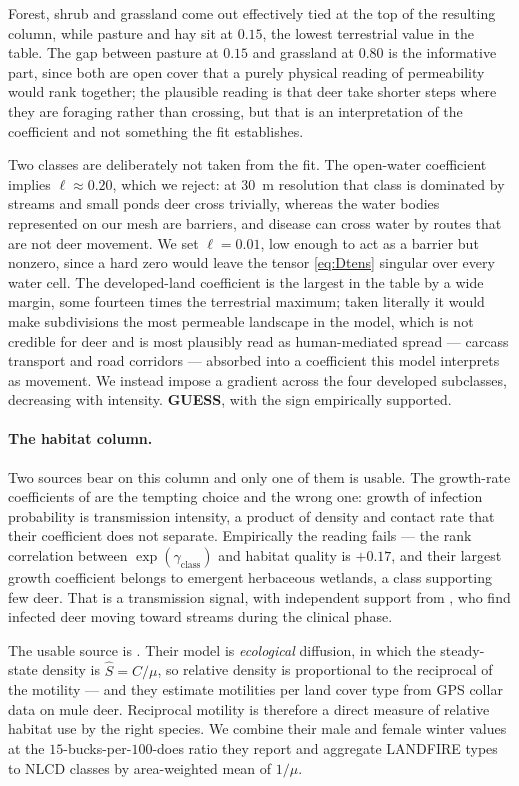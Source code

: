 \documentclass[11pt]{article}
\newcommand{\tagGUESS}{{\footnotesize\textsf{\textbf{\textcolor{red!70!black}{GUESS}}}}}
\begin{document}
Forest, shrub and grassland come out effectively tied at the top of the resulting column, while pasture and hay sit at $0.15$, the lowest terrestrial value in the table. The gap between pasture at $0.15$ and grassland at $0.80$ is the informative part, since both are open cover that a purely physical reading of permeability would rank together; the plausible reading is that deer take shorter steps where they are foraging rather than crossing, but that is an interpretation of the coefficient and not something the fit establishes.

Two classes are deliberately not taken from the fit. The open-water coefficient implies $\ell \approx 0.20$, which we reject: at $30$~m resolution that class is dominated by streams and small ponds deer cross trivially, whereas the water bodies represented on our mesh are barriers, and disease can cross water by routes that are not deer movement. We set $\ell = 0.01$, low enough to act as a barrier but nonzero, since a hard zero would leave the tensor \eqref{eq:Dtens} singular over every water cell. The developed-land coefficient is the largest in the table by a wide margin, some fourteen times the terrestrial maximum; taken literally it would make subdivisions the most permeable landscape in the model, which is not credible for deer and is most plausibly read as human-mediated spread --- carcass transport and road corridors --- absorbed into a coefficient this model interprets as movement. We instead impose a gradient across the four developed subclasses, decreasing with intensity. \tagGUESS{}, with the sign empirically supported.

\paragraph{The habitat column.} Two sources bear on this column and only one of them is usable. The growth-rate coefficients of \citet{MandujanoReyes2025} are the tempting choice and the wrong one: growth of infection probability is transmission intensity, a product of density and contact rate that their coefficient does not separate. Empirically the reading fails --- the rank correlation between $\exp(\gamma_{\text{class}})$ and habitat quality is $+0.17$, and their largest growth coefficient belongs to emergent herbaceous wetlands, a class supporting few deer. That is a transmission signal, with independent support from \citet{Barrile2024}, who find infected deer moving toward streams during the clinical phase.

The usable source is \citet{Garlick2013}. Their model is \emph{ecological} diffusion, in which the steady-state density is $\hat S = C/\mu$, so relative density is proportional to the reciprocal of the motility --- and they estimate motilities per land cover type from GPS collar data on mule deer. Reciprocal motility is therefore a direct measure of relative habitat use by the right species. We combine their male and female winter values at the $15$-bucks-per-$100$-does ratio they report and aggregate LANDFIRE types to NLCD classes by area-weighted mean of $1/\mu$.
\end{document}
